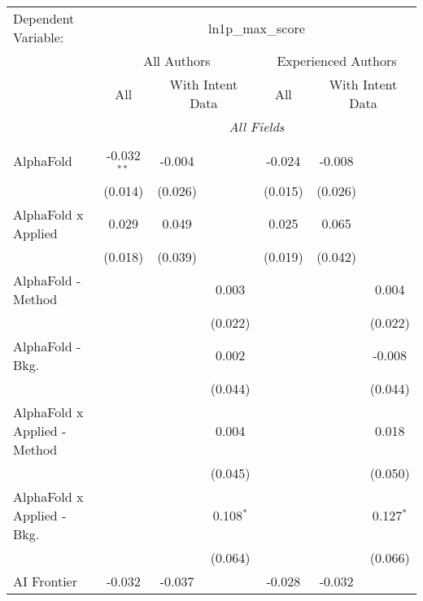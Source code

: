 \begingroup
\centering
\begin{tabular}{lcccccc}
   \tabularnewline \midrule \midrule
   Dependent Variable: & \multicolumn{6}{c}{ln1p\_max\_score}\\
 & \multicolumn{3}{c}{All Authors} & \multicolumn{3}{c}{Experienced Authors} \\
\cmidrule(lr){2-4} \cmidrule(lr){5-7}
 & \multicolumn{1}{c}{All} & \multicolumn{2}{c}{With Intent Data} & \multicolumn{1}{c}{All} & \multicolumn{2}{c}{With Intent Data} \\
\cmidrule(lr){2-2} \cmidrule(lr){3-4} \cmidrule(lr){5-5} \cmidrule(lr){6-7}
 & \multicolumn{6}{c}{\textit{All Fields}} \\ \\
   AlphaFold                      & -0.032$^{**}$ & -0.004  &              & -0.024  & -0.008  &   \\   
                                  & (0.014)       & (0.026) &              & (0.015) & (0.026) &   \\   
   AlphaFold x Applied            & 0.029         & 0.049   &              & 0.025   & 0.065   &   \\   
                                  & (0.018)       & (0.039) &              & (0.019) & (0.042) &   \\   
   AlphaFold - Method             &               &         & 0.003        &         &         & 0.004\\   
                                  &               &         & (0.022)      &         &         & (0.022)\\   
   AlphaFold - Bkg.               &               &         & 0.002        &         &         & -0.008\\   
                                  &               &         & (0.044)      &         &         & (0.044)\\   
   AlphaFold x Applied - Method   &               &         & 0.004        &         &         & 0.018\\   
                                  &               &         & (0.045)      &         &         & (0.050)\\   
   AlphaFold x Applied - Bkg.     &               &         & 0.108$^{*}$  &         &         & 0.127$^{*}$\\   
                                  &               &         & (0.064)      &         &         & (0.066)\\   
   AI Frontier                    & -0.032        & -0.037  &              & -0.028  & -0.032  &   \\   

\end{tabular}
